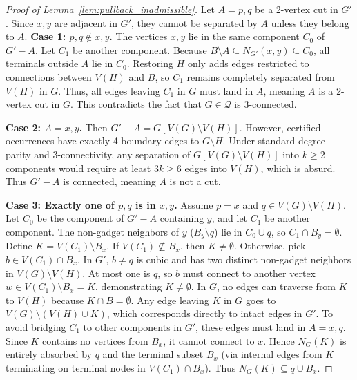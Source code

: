 \begin{proof}[Proof of Lemma~\ref{lem:pullback_inadmissible}] Let $A={p,q}$ be a 2-vertex cut in $G'$. Since $x,y$ are adjacent in $G'$, they cannot be separated by $A$ unless they belong to $A$. \textbf{Case 1: $p,q \notin {x,y}$.} The vertices $x,y$ lie in the same component $C_0$ of $G'-A$. Let $C_1$ be another component. Because $B \setminus A \subseteq N_{G'}({x,y}) \subseteq C_0$, all terminals outside $A$ lie in $C_0$. Restoring $H$ only adds edges restricted to connections between $V(H)$ and $B$, so $C_1$ remains completely separated from $V(H)$ in $G$. Thus, all edges leaving $C_1$ in $G$ must land in $A$, meaning $A$ is a 2-vertex cut in $G$. This contradicts the fact that $G \in \mathcal{Q}$ is 3-connected.

\textbf{Case 2: $A = {x,y}$.} Then $G'-A = G[V(G)\setminus V(H)]$. However, certified occurrences have exactly 4 boundary edges to $G \setminus H$. Under standard degree parity and 3-connectivity, any separation of $G[V(G)\setminus V(H)]$ into $k \ge 2$ components would require at least $3k \ge 6$ edges into $V(H)$, which is absurd. Thus $G'-A$ is connected, meaning $A$ is not a cut.

\textbf{Case 3: Exactly one of ${p,q}$ is in ${x,y}$.} Assume $p=x$ and $q \in V(G)\setminus V(H)$. Let $C_0$ be the component of $G'-A$ containing $y$, and let $C_1$ be another component. The non-gadget neighbors of $y$ ($B_y \setminus {q}$) lie in $C_0 \cup {q}$, so $C_1 \cap B_y = \emptyset$. Define $K = V(C_1) \setminus B_x$. If $V(C_1) \nsubseteq B_x$, then $K \neq \emptyset$. Otherwise, pick $b \in V(C_1) \cap B_x$. In $G'$, $b \neq q$ is cubic and has two distinct non-gadget neighbors in $V(G) \setminus V(H)$. At most one is $q$, so $b$ must connect to another vertex $w \in V(C_1) \setminus B_x = K$, demonstrating $K \neq \emptyset$. In $G$, no edges can traverse from $K$ to $V(H)$ because $K \cap B = \emptyset$. Any edge leaving $K$ in $G$ goes to $V(G) \setminus (V(H) \cup K)$, which corresponds directly to intact edges in $G'$. To avoid bridging $C_1$ to other components in $G'$, these edges must land in $A={x,q}$. Since $K$ contains no vertices from $B_x$, it cannot connect to $x$. Hence $N_G(K)$ is entirely absorbed by ${q}$ and the terminal subset $B_x$ (via internal edges from $K$ terminating on terminal nodes in $V(C_1) \cap B_x$). Thus $N_G(K) \subseteq {q} \cup B_x$. \end{proof}

